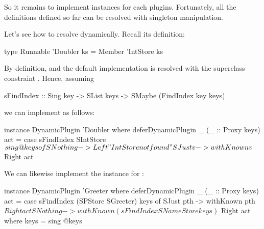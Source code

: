 \documentclass[demotion-paper.tex]{subfiles}
\begin{document}
So it remains to implement  instances for each plugins.
Fortunately, all the  definitions defined so far can be resolved with singleton manipulation.

Let's see how to resolve  dynamically.
Recall its definition:
\begin{code}
type Runnable 'Doubler ks = Member 'IntStore ks
\end{code}
By definition,  and the default implementation is resolved with the superclass constraint .
Hence, assuming
\begin{code}
sFindIndex :: Sing key -> SList keys
      -> SMaybe (FindIndex key keys)
\end{code}
we can implement  as follows:
\begin{code}
instance DynamicPlugin 'Doubler where
  deferDynamicPlugin _ (_ :: Proxy keys) act =
  case sFindIndex SIntStore $ sing @keys of
    SNothing -> Left "IntStore not found"
    SJust v -> withKnown v $ Right act
\end{code}
We can likewise implement the instance for :
\begin{code}
instance DynamicPlugin 'Greeter where
  deferDynamicPlugin _ (_ :: Proxy keys) act =
    case sFindIndex (SPStore SGreeter) keys of
      SJust pth -> withKnown pth $ Right act
      SNothing ->
        withKnown (sFindIndex SNameStore keys) $
          Right act
    where keys = sing @keys
\end{code}
\end{document}
